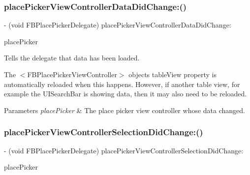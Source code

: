 \subsubsection{\texorpdfstring{place\+Picker\+View\+Controller\+Data\+Did\+Change\+:()}{placePickerViewControllerDataDidChange:()}\hspace{0.1cm}{\footnotesize\ttfamily [5/5]}}
{\footnotesize\ttfamily -\/ (void F\+B\+Place\+Picker\+Delegate) place\+Picker\+View\+Controller\+Data\+Did\+Change\+: \begin{DoxyParamCaption}\item[{(\hyperlink{interfaceFBPlacePickerViewController}{F\+B\+Place\+Picker\+View\+Controller} $\ast$)}]{place\+Picker }\end{DoxyParamCaption}\hspace{0.3cm}{\ttfamily [optional]}}

Tells the delegate that data has been loaded.

The $<$\+F\+B\+Place\+Picker\+View\+Controller$>$ object\textquotesingle{}s {\ttfamily table\+View} property is automatically reloaded when this happens. However, if another table view, for example the {\ttfamily U\+I\+Search\+Bar} is showing data, then it may also need to be reloaded.


\begin{DoxyParams}{Parameters}
{\em place\+Picker} & The place picker view controller whose data changed. \\
\hline
\end{DoxyParams}
\mbox{\label{protocolFBPlacePickerDelegate_01-p_a45f5c05ae6b3d030c4350562954964db}} 
\subsubsection{\texorpdfstring{place\+Picker\+View\+Controller\+Selection\+Did\+Change\+:()}{placePickerViewControllerSelectionDidChange:()}\hspace{0.1cm}{\footnotesize\ttfamily [1/5]}}
{\footnotesize\ttfamily -\/ (void F\+B\+Place\+Picker\+Delegate) place\+Picker\+View\+Controller\+Selection\+Did\+Change\+: \begin{DoxyParamCaption}\item[{(\hyperlink{interfaceFBPlacePickerViewController}{F\+B\+Place\+Picker\+View\+Controller} $\ast$)}]{place\+Picker }\end{DoxyParamCaption}\hspace{0.3cm}{\ttfamily [optional]}}


